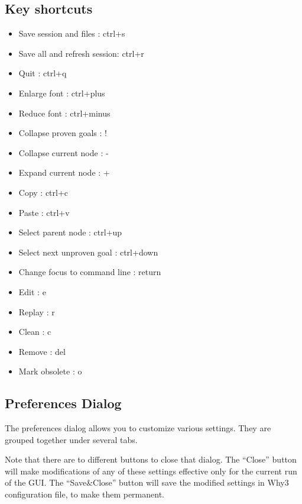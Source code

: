 \subsection{Key shortcuts}


\begin{itemize}
\item Save session and files : ctrl+s
\item Save all and refresh session: ctrl+r
\item Quit : ctrl+q
\item Enlarge font : ctrl+plus
\item Reduce font : ctrl+minus
\item Collapse proven goals : !
\item Collapse current node : -
\item Expand current node : +
\item Copy : ctrl+c
\item Paste : ctrl+v
\item Select parent node : ctrl+up
\item Select next unproven goal : ctrl+down
\item Change focus to command line : return
\item Edit : e
\item Replay : r
\item Clean : c
\item Remove : del
\item Mark obsolete : o
\end{itemize}

\subsection{Preferences Dialog}

The preferences dialog allows you to customize various settings. They
are grouped together under several tabs.

Note that there are to different buttons to close that dialog. The
``Close'' button will make modifications of any of these settings
effective only for the current run of the GUI. The ``Save\&Close''
button will save the modified settings in Why3 configuration file, to
make them permanent.


